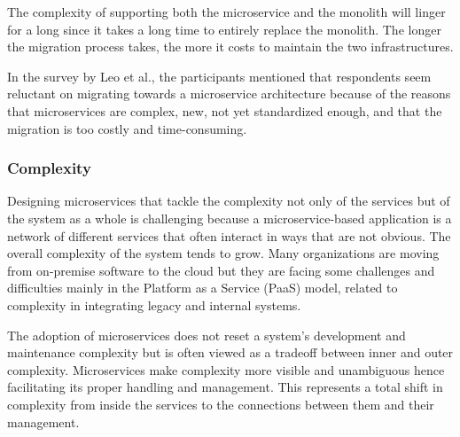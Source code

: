 The complexity of supporting both the microservice and the monolith will linger for a long since it takes a long time to entirely replace the monolith. The longer the migration process takes, the more it costs to maintain the two infrastructures.\cite{Meshenberg2016, Michael2018, Ndungu2019}

In the survey by Leo et al.,\cite{Leo2019} the participants mentioned that respondents seem reluctant on migrating towards a microservice architecture because of the reasons that microservices are complex, new, not yet standardized enough, and that the migration is too costly and time-consuming.



\subsubsection{Complexity}%

Designing microservices that tackle the complexity not only of the services but of the system as a whole is challenging because a microservice-based application is a network of different services that often interact in ways that are not obvious. The overall complexity of the system tends to grow. Many organizations are moving from on-premise software to the cloud but they are facing some challenges and difficulties mainly in the Platform as a Service (PaaS) model, related to complexity in integrating legacy and internal systems.\cite{rosa2018, Zaytev2018}

The adoption of microservices does not reset a system's development and maintenance complexity but is often viewed as a tradeoff between inner and outer complexity. Microservices make complexity more visible and unambiguous hence facilitating its proper handling and management. This represents a total shift in complexity from inside the services to the connections between them and their management.\cite{Ndungu2019, gozneli2020}

